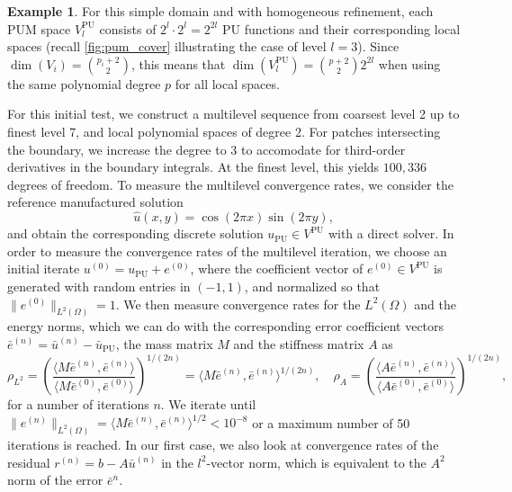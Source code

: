 \documentclass[a4paper]{article}
\newcommand{\norm}[1]{\lVert#1\rVert}
\theoremstyle{plain}
\theoremstyle{definition}
\newtheorem{example}{Example}[section]
\theoremstyle{remark}
\begin{document}
\begin{example}
	For this simple domain and with homogeneous refinement, each PUM space \(V^{\mathrm{PU}}_l\) consists of \(2^l \cdot 2^l = 2^{2l}\) PU functions and their corresponding local spaces (recall \cref{fig:pum_cover} illustrating the case of level \(l=3\)). Since \(\dim(V_i) = \binom{p_i+2}{2}\), this means that \(\dim(V^{\mathrm{PU}}_l) = \binom{p+2}{2} 2^{2l}\) when using the same polynomial degree \(p\) for all local spaces.
	
	For this initial test, we construct a multilevel sequence from coarsest level 2 up to finest level 7, and local polynomial spaces of degree 2. For patches intersecting the boundary, we increase the degree to 3 to accomodate for third-order derivatives in the boundary integrals. At the finest level, this yields \(100,336\) degrees of freedom. To measure the multilevel convergence rates, we consider the reference manufactured solution
	\begin{equation*}
		\hat{u}(x, y) = \cos(2 \pi x) \sin(2 \pi y),
	\end{equation*}
	and obtain the corresponding discrete solution \(u_{\mathrm{PU}} \in V^{\mathrm{PU}}\) with a direct solver. In order to measure the convergence rates of the multilevel iteration, we choose an initial iterate \(u^{(0)} = u_{\mathrm{PU}} + e^{(0)}\), where the coefficient vector of \(e^{(0)} \in V^{\mathrm{PU}}\) is generated with random entries in \((-1, 1)\), and normalized so that \(\norm{e^{(0)}}_{L^2(\Omega)} = 1\). We then measure convergence rates for the \(L^2(\Omega)\) and the energy norms, which we can do with the corresponding error coefficient vectors \(\bar{e}^{(n)} = \bar{u}^{(n)} - \bar{u}_{\mathrm{PU}}\), the mass matrix \(M\) and the stiffness matrix \(A\) as
	\begin{equation*}
		\rho_{L^2} = \left(\frac{\langle M \bar{e}^{(n)}, \bar{e}^{(n)} \rangle}{\langle M \bar{e}^{(0)}, \bar{e}^{(0)} \rangle} \right)^{1/(2n)} = \langle M \bar{e}^{(n)}, \bar{e}^{(n)} \rangle^{1/(2n)}, \quad \rho_{A} = \left(\frac{\langle A \bar{e}^{(n)}, \bar{e}^{(n)} \rangle}{\langle A \bar{e}^{(0)}, \bar{e}^{(0)} \rangle} \right)^{1/(2n)},
	\end{equation*}
	for a number of iterations \(n\). We iterate until \(\norm{e^{(n)}}_{L^2(\Omega)} = \langle M \bar{e}^{(n)}, \bar{e}^{(n)} \rangle^{1/2} < 10^{-8}\) or a maximum number of 50 iterations is reached. In our first case, we also look at convergence rates of the residual \(r^{(n)} = b - A \bar{u}^{(n)}\) in the \(l^2\)-vector norm, which is equivalent to the \(A^2\) norm of the error \(\bar{e}^{n}\).
	

\end{example}
\end{document}
